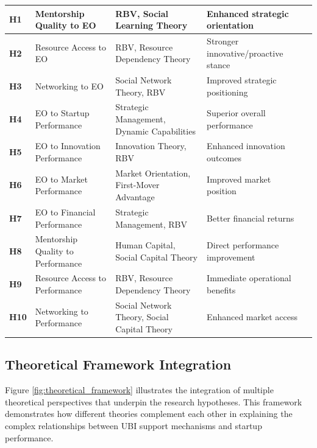 \documentclass[../Main.tex]{subfiles}
\begin{document}
\begin{table}[H]
\begin{longtable}{|p{1.5cm}|p{3cm}|p{4cm}|p{3cm}|p{2.5cm}|}
            \textbf{H1} & Mentorship Quality to EO & RBV, Social Learning Theory & Enhanced strategic orientation & \autocite{bandura1997self, zhao2005developing} \\
            \hline
            \textbf{H2} & Resource Access to EO & RBV, Resource Dependency Theory & Stronger innovative/proactive stance & \autocite{wiklund2005entrepreneurial, bruton2010governance} \\
            \hline
            \textbf{H3} & Networking to EO & Social Network Theory, RBV & Improved strategic positioning & \autocite{stam2008entrepreneurial, batjargal2003social} \\
            \hline
            \textbf{H4} & EO to Startup Performance & Strategic Management, Dynamic Capabilities & Superior overall performance & \autocite{rauch2009entrepreneurial, saeed2014entrepreneurial} \\
            \hline
            \textbf{H5} & EO to Innovation Performance & Innovation Theory, RBV & Enhanced innovation outcomes & \autocite{lumpkin1996clarifying, wiklund2003knowledge} \\
            \hline
            \textbf{H6} & EO to Market Performance & Market Orientation, First-Mover Advantage & Improved market position & \autocite{lumpkin2001linking, wiklund2005entrepreneurial} \\
            \hline
            \textbf{H7} & EO to Financial Performance & Strategic Management, RBV & Better financial returns & \autocite{rauch2009entrepreneurial, wales2013entrepreneurial} \\
            \hline
            \textbf{H8} & Mentorship Quality to Performance & Human Capital, Social Capital Theory & Direct performance improvement & \autocite{stjean2012mentoring, sullivan2011effectiveness} \\
            \hline
            \textbf{H9} & Resource Access to Performance & RBV, Resource Dependency Theory & Immediate operational benefits & \autocite{cooper1994initial, bruton2010governance} \\
            \hline
            \textbf{H10} & Networking to Performance & Social Network Theory, Social Capital Theory & Enhanced market access & \autocite{stam2008entrepreneurial, batjargal2003social} \\
            \hline
        \end{longtable}
    \end{table}

    \subsection{Theoretical Framework Integration}
    Figure \ref{fig:theoretical_framework} illustrates the integration of multiple theoretical perspectives that underpin the research hypotheses. This framework demonstrates how different theories complement each other in explaining the complex relationships between UBI support mechanisms and startup performance.
\end{document}
